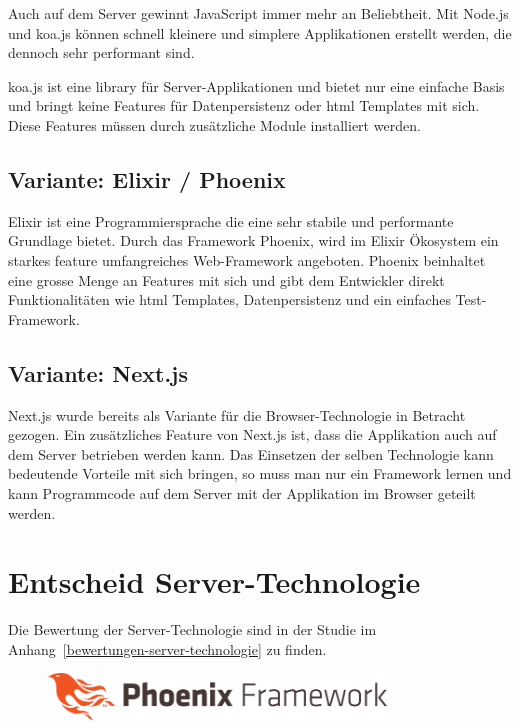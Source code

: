 Auch auf dem Server gewinnt JavaScript immer mehr an Beliebtheit.
Mit Node.js und koa.js können schnell kleinere und simplere Applikationen
erstellt werden, die dennoch sehr performant sind.

koa.js ist eine \Gls{library} für Server-Applikationen und bietet nur eine einfache
Basis und bringt keine Features für Datenpersistenz oder \Gls{html} Templates mit sich.
Diese Features müssen durch zusätzliche Module installiert werden.

\subsection{Variante: Elixir / Phoenix}

Elixir ist eine Programmiersprache die eine sehr stabile und performante Grundlage
bietet. Durch das Framework Phoenix, wird im Elixir Ökosystem ein starkes feature
umfangreiches Web-Framework angeboten. Phoenix beinhaltet eine grosse Menge an
Features mit sich und gibt dem Entwickler direkt Funktionalitäten wie \Gls{html}
Templates, Datenpersistenz und ein einfaches Test-Framework.

\subsection{Variante: Next.js}

Next.js wurde bereits als Variante für die Browser-Technologie in Betracht
gezogen. Ein zusätzliches Feature von Next.js ist, dass die Applikation auch
auf dem Server betrieben werden kann.
Das Einsetzen der selben Technologie kann bedeutende Vorteile mit sich bringen,
so muss man nur ein Framework lernen und kann Programmcode auf dem Server mit
der Applikation im Browser geteilt werden.

\section{Entscheid Server-Technologie}\label{entscheid-server-technologie}

Die Bewertung der Server-Technologie sind in der Studie im
Anhang~\ref{bewertungen-server-technologie} zu finden.

\begin{figure}[!htb]
  \centering
  \includegraphics[width=0.8\textwidth]{figures/phoenix.png}
\end{figure}

